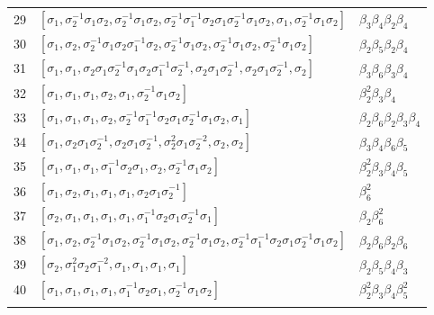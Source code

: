 \documentclass[12pt,a4paper]{article}
\numberwithin{equation}{section}
\numberwithin{table}{section}
\begin{document}
\begin{table}[H]
\begin{tabular}{lll}
29&$[\sigma_1,\sigma_2^{-1}\sigma_1\sigma_2,\sigma_2^{-1}\sigma_1\sigma_2,
\sigma_2^{-1}\sigma_1^{-1}\sigma_2\sigma_1\sigma_2^{-1}\sigma_1\sigma_2,
\sigma_1,\sigma_2^{-1}\sigma_1\sigma_2]$&$\beta_3\beta_4\beta_2\beta_4$\\
30&$[\sigma_1,\sigma_2,\sigma_2^{-1}\sigma_1\sigma_2\sigma_1^{-1}\sigma_2,\sigma_2^{-1}\sigma_1\sigma_2,
\sigma_2^{-1}\sigma_1\sigma_2,\sigma_2^{-1}\sigma_1\sigma_2]$&$\beta_2\beta_5\beta_2\beta_4$\\
\noalign{\smallskip}\hline\noalign{\smallskip}
31&$[\sigma_1,\sigma_1,\sigma_2\sigma_1\sigma_2^{-1}\sigma_1\sigma_2\sigma_1^{-1}\sigma_2^{-1},
\sigma_2\sigma_1\sigma_2^{-1},\sigma_2\sigma_1\sigma_2^{-1},\sigma_2]$&$\beta_3\beta_6\beta_3\beta_4$\\
32&$[\sigma_1,\sigma_1,\sigma_1,\sigma_2,\sigma_1,\sigma_2^{-1}\sigma_1\sigma_2]$&$\beta_2^{2}\beta_3\beta_4$\\
33&$[\sigma_1,\sigma_1,\sigma_1,\sigma_2,\sigma_2^{-1}\sigma_1^{-1}\sigma_2\sigma_1\sigma_2^{-1}\sigma_1\sigma_2,
\sigma_1]$&$\beta_2\beta_6\beta_2\beta_3\beta_4$\\
34&$[\sigma_1,\sigma_2\sigma_1\sigma_2^{-1},\sigma_2\sigma_1\sigma_2^{-1},\sigma_2^{2}\sigma_1\sigma_2^{-2},
\sigma_2,\sigma_2]$&$\beta_3\beta_4\beta_6\beta_5$\\
35&$[\sigma_1,\sigma_1,\sigma_1,\sigma_1^{-1}\sigma_2\sigma_1,\sigma_2,
\sigma_2^{-1}\sigma_1\sigma_2]$&$\beta_2^{2}\beta_3\beta_4\beta_5$\\
36&$[\sigma_1,\sigma_2,\sigma_1,\sigma_1,\sigma_1,\sigma_2\sigma_1\sigma_2^{-1}]$&$\beta_6^{2}$\\
37&$[\sigma_2,\sigma_1,\sigma_1,\sigma_1,\sigma_1,\sigma_1^{-1}\sigma_2\sigma_1\sigma_2^{-1}\sigma_1]$&$\beta_2\beta_6^{2}$\\
38&$[\sigma_1,\sigma_2,\sigma_2^{-1}\sigma_1\sigma_2,\sigma_2^{-1}\sigma_1\sigma_2,\sigma_2^{-1}\sigma_1\sigma_2,
\sigma_2^{-1}\sigma_1^{-1}\sigma_2\sigma_1\sigma_2^{-1}\sigma_1\sigma_2]$&$\beta_2\beta_6\beta_2\beta_6$\\
39&$[\sigma_2,\sigma_1^{2}\sigma_2\sigma_1^{-2},\sigma_1,\sigma_1,\sigma_1,\sigma_1]$&$\beta_2\beta_5\beta_4\beta_3$\\
40&$[\sigma_1,\sigma_1,\sigma_1,\sigma_1,\sigma_1^{-1}\sigma_2\sigma_1,\sigma_2^{-1}\sigma_1\sigma_2]$
&$\beta_2^{2}\beta_3\beta_4\beta_5^{2}$\\
\noalign{\smallskip}\hline
\end{tabular}
\end{table}
%
\end{document}
